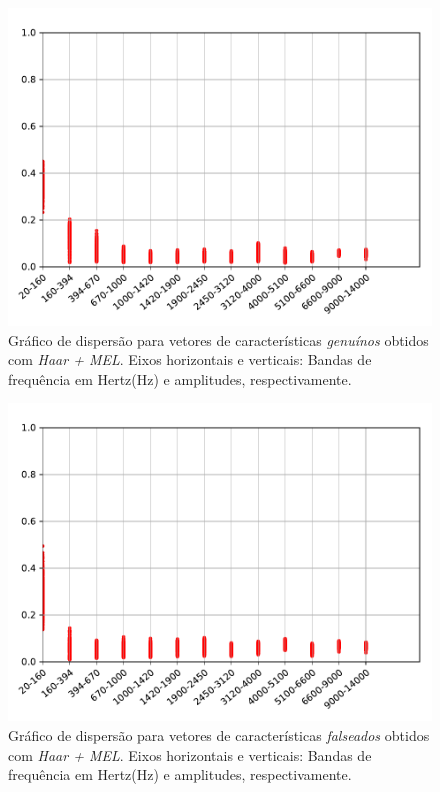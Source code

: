 \begin{figure}[H]
	\centering
	\includegraphics[scale=.8]{./images/results/barkVersusMel/Genuine_haar_Mel.pdf}
	\caption{Gráfico de dispersão para vetores de características \textit{genuínos} obtidos com \textit{Haar + MEL}. Eixos horizontais e verticais: Bandas de frequência em Hertz(Hz) e amplitudes, respectivamente.}
	\label{fig:livehaarmel}
\end{figure}
\begin{figure}[H]
	\centering
	\includegraphics[scale=.8]{./images/results/barkVersusMel/Spoofing_haar_Mel.pdf}
	\caption{Gráfico de dispersão para vetores de características \textit{falseados} obtidos com \textit{Haar + MEL}. Eixos horizontais e verticais: Bandas de frequência em Hertz(Hz) e amplitudes, respectivamente.}
	\label{fig:spoofinghaarmel}
\end{figure}
